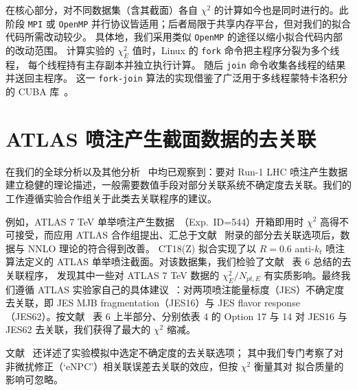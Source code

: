 在核心部分，对不同数据集（含其截面）各自 $\chi^2$ 的计算如今也是同时进行的。此阶段 \texttt{MPI} 或 \texttt{OpenMP} 并行协议皆适用；后者局限于共享内存平台，但对我们的拟合代码所需改动较少。
具体地，我们采用类似 \texttt{OpenMP} 的途径以缩小拟合代码内部的改动范围。
计算实验的 $\chi^2_E$ 值时，Linux 的 \verb|fork| 命令把主程序分裂为多个线程，
每个线程持有主存副本并独立执行计算。
随后 \verb|join| 命令收集各线程的结果并送回主程序。
这一 \verb|fork-join| 算法的实现借鉴了广泛用于多线程蒙特卡洛积分的
CUBA 库~\cite{Hahn:2004fe}。

\section{ATLAS 喷注产生截面数据的去关联}
\label{sec:ATLASjetdecorrel}
在我们的全球分析以及其他分析~\cite{Harland-Lang:2017ytb} 中均已观察到：要对 Run-1 LHC 喷注产生数据建立稳健的理论描述，一般需要数值手段对部分关联系统不确定度去关联。我们的工作遵循实验合作组关于此类去关联程序的建议。

例如，ATLAS 7 TeV 单举喷注产生数据~\cite{Aad:2014vwa}（Exp.~ID=544）开箱即用时 $\chi^2$ 高得不可接受，而应用 ATLAS 合作组提出、汇总于文献~\cite{Aaboud:2017dvo} 附录的部分去关联选项后，数据与 NNLO 理论的符合得到改善。
CT18(Z) 拟合实现了以 $R=0.6$ anti-$k_t$ 喷注算法定义的 ATLAS 单举喷注截面。对该数据集，我们检验了文献~\cite{Aaboud:2017dvo} 表 6 总结的去关联程序，
发现其中一些对 ATLAS 7 TeV 数据的 $\chi^2_E/N_\mathit{pt,E}$ 有实质影响。最终我们遵循 ATLAS 实验家自己的具体建议~\cite{Bogdan}：对两项喷注能量标度（JES）不确定度去关联，即 JES MJB fragmentation（JES16）与 JES flavor response
（JES62）。按文献~\cite{Aaboud:2017dvo} 表 6 上半部分、分别依表 4 的 Option 17 与 14 对 JES16 与 JES62 去关联，我们获得了最大的 $\chi^2$ 缩减。

文献~\cite{Aaboud:2017dvo}
还详述了实验模拟中选定不确定度的去关联选项；
其中我们专门考察了对非微扰修正（`eNPC'）相关联误差去关联的效应，但按 $\chi^2$ 衡量其对 \CTHERAII{} 拟合质量的影响可忽略。

